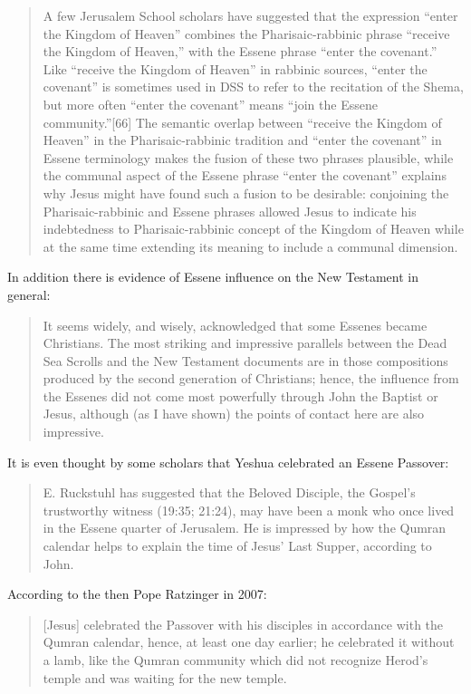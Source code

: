 \documentclass[11pt]{article}
\begin{document}
\begin{quote}
A few Jerusalem School scholars have suggested that the expression “enter the Kingdom of Heaven” combines the Pharisaic-rabbinic phrase “receive the Kingdom of Heaven,” with the Essene phrase “enter the covenant.” Like “receive the Kingdom of Heaven” in rabbinic sources, “enter the covenant” is sometimes used in DSS to refer to the recitation of the Shema, but more often “enter the covenant” means “join the Essene community.”[66] The semantic overlap between “receive the Kingdom of Heaven” in the Pharisaic-rabbinic tradition and “enter the covenant” in Essene terminology makes the fusion of these two phrases plausible, while the communal aspect of the Essene phrase “enter the covenant” explains why Jesus might have found such a fusion to be desirable: conjoining the Pharisaic-rabbinic and Essene phrases allowed Jesus to indicate his indebtedness to Pharisaic-rabbinic concept of the Kingdom of Heaven while at the same time extending its meaning to include a communal dimension. \cite{kingdom of heaven jp}
\end{quote} 
In addition there is evidence of Essene influence on the New Testament in general: 
\begin{quote}
It seems widely, and wisely, acknowledged that some Essenes became Christians. The most striking and impressive parallels between the Dead Sea Scrolls and the New Testament documents are in those compositions produced by the second generation of Christians; hence, the influence from the Essenes did not come most powerfully through John the Baptist or Jesus, although (as I have shown) the points of contact here are also impressive.\cite{Exploring the Gospel of John}
\end{quote}
It is even thought by some scholars that Yeshua celebrated an Essene Passover:
 \begin{quote}
E. Ruckstuhl has suggested that the Beloved Disciple, the Gospel's trustworthy witness (19:35; 21:24), may have been a monk who once lived in the Essene quarter of Jerusalem. He is impressed by how the Qumran calendar helps to explain the time of Jesus' Last Supper, according to John.\cite{Exploring the Gospel of John} \end{quote}
According to the then Pope Ratzinger in 2007:
\begin{quote}
[Jesus] celebrated the Passover with his disciples in accordance with the Qumran calendar, hence, at least one day earlier; he celebrated it without a lamb, like the Qumran community which did not recognize Herod's temple and was waiting for the new temple. \cite{HOMILY OF HIS HOLINESS BENEDICT XVI}
\end{quote}
\end{document}
